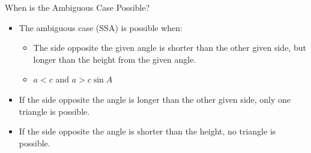 \documentclass[aspectratio=169]{beamer}
\begin{document}
\begin{frame}{When is the Ambiguous Case Possible?}
    \begin{tcolorbox}[colback=lightgray,colframe=primary,title=Summary]
        \footnotesize
        \begin{itemize}
            \item The ambiguous case (SSA) is possible when:
            \begin{itemize}
                \item The side opposite the given angle is shorter than the other given side, but longer than the height from the given angle.
                \item $a < c$ and $a > c \sin A$
            \end{itemize}
            \item If the side opposite the angle is longer than the other given side, only one triangle is possible.
            \item If the side opposite the angle is shorter than the height, no triangle is possible.
        \end{itemize}
    \end{tcolorbox}
\end{frame}
\end{document}
